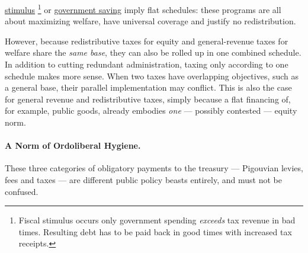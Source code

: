 \begin{description}
	\hyperref[sec:fiscal-stimulus]{stimulus}
	\footnote{
		Fiscal stimulus occurs only government spending \emph{exceeds} tax revenue in bad times.
		Resulting debt has to be paid back in good times with increased tax receipts.
	}
	or \hyperref[sec:government-saves]{government saving} imply flat schedules:
	these programs are all about maximizing welfare, have universal coverage and justify no redistribution.

	However,
	 \label{sec:redistribution-and-revenue-are-one} because redistributive taxes for equity and general-revenue taxes for welfare share the \emph{same base}, they can also be rolled up in one combined schedule.
In addition to cutting redundant administration, taxing only according to one schedule makes more sense.
When two taxes have overlapping objectives, such as a general base, their parallel implementation may conflict.
This is also the case for general revenue and redistributive taxes, simply because a flat financing of, for example, public goods, already embodies \emph{one} --- possibly contested --- equity norm.

\end{description}

\paragraph[Ordoliberal Hygiene]{A Norm of Ordoliberal Hygiene.}  \label{sec:ordoliberal-hygiene} These three categories of obligatory payments to the treasury --- Pigouvian levies, fees and taxes --- are different public policy beasts entirely, and must not be confused.

%
%

